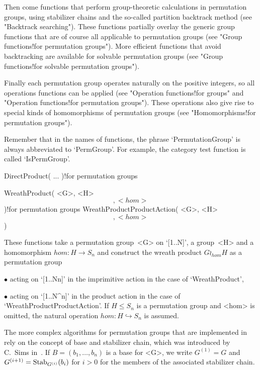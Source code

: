 Then  come functions that     perform  group-theoretic calculations    in
permutation groups, using  stabilizer chains and  the so-called partition
backtrack  method (see "Backtrack  searching"). These functions partially
overlay the generic group functions that  are of course all applicable to
permutation groups (see "Group  functions!for permutation  groups"). More
efficient functions that   avoid backtracking are available for  solvable
permutation groups (see   "Group   functions!for   solvable   permutation
groups").

Finally  each permutation    group  operates naturally    on the positive
integers,  so all  operations  functions can  be applied (see  "Operation
functions!for  groups" and "Operation functions!for permutation groups").
These operations  also give  rise to  special kinds  of  homomorphisms of
permutation groups (see "Homomorphisms!for permutation groups").

Remember that     in   the  names   of  {\GAP}    functions,  the  phrase
`PermutationGroup' is always abbreviated to `PermGroup'. For example, the
category test function is called `IsPermGroup'.


\>DirectProduct( ... )!{for permutation groups}

\>WreathProduct( <G>, <H> \[, <hom> \] )!{for permutation groups}
\>WreathProductProductAction( <G>, <H> \[, <hom> \] )

These functions take a permutation group~<G> on `[1..N]', a group~<H> and
a homomorphism  $hom\colon  H\to S_n$ and  construct  the wreath  product
$G\wr_{hom}H$ as a permutation group
\beginlist
  \item{$\bullet$} acting on `[1..N\*n]' in the imprimitive action in the
    case of `WreathProduct',
  \item{$\bullet$} acting on `[1..N^n]' in the product action in the case
    of `WreathProductProductAction'.
\endlist
If $H\le S_n$  is a permutation group  and <hom> is  omitted, the natural
operation $hom\colon H\hookrightarrow S_n$ is assumed.


The more complex algorithms  for permutation groups that  are implemented
in  {\GAP} rely on the concept  of base and  stabilizer  chain, which was
introduced by C.~Sims in~\cite{Sims70}. If   $B=(b_1, \ldots, b_n)$ is  a
base    for   <G>,   we    write    $G^{(1)}=G$   and     $G^{(i+1)}={\rm
Stab}_{G^{(i)}}(b_i)$   for $i>0$  for the   members   of the  associated
stabilizer chain.

